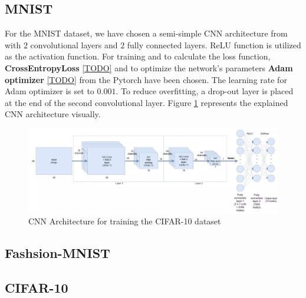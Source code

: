 \subsection{MNIST}
For the MNIST dataset, we have chosen a semi-simple CNN architecture from \cite{MNIST_CNN_Architecture} with $2$
convolutional layers and $2$ fully connected layers. ReLU function is utilized as the activation
function. For training and to calculate the loss function, \textbf{CrossEntropyLoss} \ref{TODO} and
to optimize the network's parameters \textbf{Adam optimizer} \ref{TODO} from the Pytorch have been
chosen. The learning rate for Adam optimizer is set to $0.001$. To reduce overfitting, a
drop-out layer is placed at the end of the second convolutional layer. Figure \ref{fig:MNIST_CNN_Architecture} represents the explained CNN architecture visually.

\begin{figure}
  \centering
  \label{fig:MNIST_CNN_Architecture}
  \includegraphics[width=1\textwidth]{fig/MNIST-CNN-Architecture}
  \caption{CNN Architecture for training the CIFAR-10 dataset \cite{MNIST_CNN_Architecture_Image}}
\end{figure}


\subsection{Fashsion-MNIST}

\subsection{CIFAR-10}

